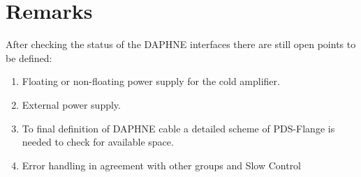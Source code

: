 \section{Remarks}
\label{sec:Remarks}

After checking the status of the DAPHNE interfaces there are still open points to be defined:

\begin{enumerate}
    \item Floating or non-floating power supply for the cold amplifier.
    \item External power supply.
    \item To final definition of DAPHNE cable a detailed scheme of PDS-Flange is needed to check for available space.
    \item Error handling in agreement with other groups and Slow Control
\end{enumerate}